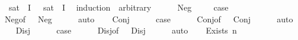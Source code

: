 \begin{isabellebody}
\ \ sat\ {\isasymphi}\ I\ {\isasymsigma}\ {\isasymlongleftrightarrow}\ sat\ {\isasymphi}\ I\ {\isasymsigma}{\isacharprime}{\kern0pt}{\isachardoublequoteclose}\isanewline
%
\isadelimproof
%
\endisadelimproof
%
\isatagproof
{}\isamarkupfalse%
\ {\isacharparenleft}{\kern0pt}induction\ {\isasymphi}\ arbitrary{\isacharcolon}{\kern0pt}\ {\isasymsigma}\ {\isasymsigma}{\isacharprime}{\kern0pt}{\isacharparenright}{\kern0pt}\isanewline
\ \ \isamarkupfalse%
\ {\isacharparenleft}{\kern0pt}Neg\ {\isasymphi}{\isacharparenright}{\kern0pt}\isanewline
\ \ \isamarkupfalse%
\ {\isacharquery}{\kern0pt}case\isanewline
\ \ \ \ \isamarkupfalse%
\ Neg{\isacharparenleft}{\kern0pt}{}{\isacharparenright}{\kern0pt}{\isacharbrackleft}{\kern0pt}of\ {\isasymsigma}\ {\isasymsigma}{\isacharprime}{\kern0pt}{\isacharbrackright}{\kern0pt}\ Neg{\isacharparenleft}{\kern0pt}{}{\isacharparenright}{\kern0pt}\isanewline
\ \ \ \ \isamarkupfalse%
\ auto\isanewline
{}\isamarkupfalse%
\isanewline
\ \ \isamarkupfalse%
\ {\isacharparenleft}{\kern0pt}Conj\ {\isasymphi}\ {\isasympsi}{\isacharparenright}{\kern0pt}\isanewline
\ \ \isamarkupfalse%
\ {\isacharquery}{\kern0pt}case\isanewline
\ \ \ \ \isamarkupfalse%
\ Conj{\isacharparenleft}{\kern0pt}{}{\isacharcomma}{\kern0pt}{}{\isacharparenright}{\kern0pt}{\isacharbrackleft}{\kern0pt}of\ {\isasymsigma}\ {\isasymsigma}{\isacharprime}{\kern0pt}{\isacharbrackright}{\kern0pt}\ Conj{\isacharparenleft}{\kern0pt}{}{\isacharparenright}{\kern0pt}\isanewline
\ \ \ \ \isamarkupfalse%
\ auto\isanewline
{}\isamarkupfalse%
\isanewline
\ \ \isamarkupfalse%
\ {\isacharparenleft}{\kern0pt}Disj\ {\isasymphi}\ {\isasympsi}{\isacharparenright}{\kern0pt}\isanewline
\ \ \isamarkupfalse%
\ {\isacharquery}{\kern0pt}case\isanewline
\ \ \ \ \isamarkupfalse%
\ Disj{\isacharparenleft}{\kern0pt}{}{\isacharcomma}{\kern0pt}{}{\isacharparenright}{\kern0pt}{\isacharbrackleft}{\kern0pt}of\ {\isasymsigma}\ {\isasymsigma}{\isacharprime}{\kern0pt}{\isacharbrackright}{\kern0pt}\ Disj{\isacharparenleft}{\kern0pt}{}{\isacharparenright}{\kern0pt}\isanewline
\ \ \ \ \isamarkupfalse%
\ auto\isanewline
{}\isamarkupfalse%
\isanewline
\ \ \isamarkupfalse%
\ {\isacharparenleft}{\kern0pt}Exists\ n\ {\isasymphi}{\isacharparenright}{\kern0pt}\isanewline

\end{isabellebody}
